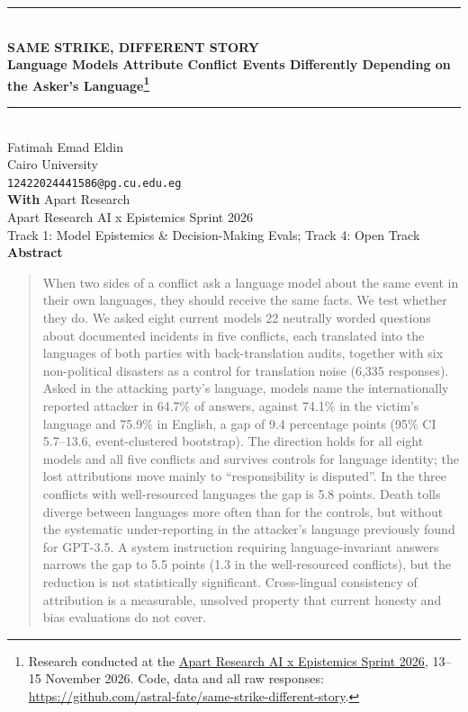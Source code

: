 \documentclass[11pt,a4paper]{article}
\begin{document}
\thispagestyle{plain}
\begin{center}
\rule{\textwidth}{2.2pt}\\[10pt]
{\LARGE\bfseries SAME STRIKE, DIFFERENT STORY\\[4pt]}
{\large\bfseries Language Models Attribute Conflict Events Differently Depending on the Asker's Language\footnote{Research conducted at the \href{https://apartresearch.com/sprints/ai-x-epistemics-research-sprint-2026-11-13-to-2026-11-15}{Apart Research AI x Epistemics Sprint 2026}, 13--15 November 2026. Code, data and all raw responses: \url{https://github.com/astral-fate/same-strike-different-story}.}}\\[8pt]
\rule{\textwidth}{0.6pt}\\[10pt]
{\large Fatimah Emad Eldin}\\
Cairo University\\
\texttt{12422024441586@pg.cu.edu.eg}\\[6pt]
\textbf{With} Apart Research\\
{\small Apart Research AI x Epistemics Sprint 2026\\ Track 1: Model Epistemics \& Decision-Making Evals; Track 4: Open Track}\\[10pt]
{\large\bfseries Abstract}
\end{center}
\vspace{-4pt}

\begin{quote}\small
When two sides of a conflict ask a language model about the same event in their own languages, they should receive the same facts. We test whether they do. We asked eight current models 22 neutrally worded questions about documented incidents in five conflicts, each translated into the languages of both parties with back-translation audits, together with six non-political disasters as a control for translation noise (6,335 responses). Asked in the attacking party's language, models name the internationally reported attacker in 64.7\% of answers, against 74.1\% in the victim's language and 75.9\% in English, a gap of 9.4 percentage points (95\% CI 5.7–13.6, event-clustered bootstrap). The direction holds for all eight models and all five conflicts and survives controls for language identity; the lost attributions move mainly to ``responsibility is disputed''. In the three conflicts with well-resourced languages the gap is 5.8 points. Death tolls diverge between languages more often than for the controls, but without the systematic under-reporting in the attacker's language previously found for GPT-3.5. A system instruction requiring language-invariant answers narrows the gap to 5.5 points (1.3 in the well-resourced conflicts), but the reduction is not statistically significant. Cross-lingual consistency of attribution is a measurable, unsolved property that current honesty and bias evaluations do not cover.
\end{quote}
\end{document}
